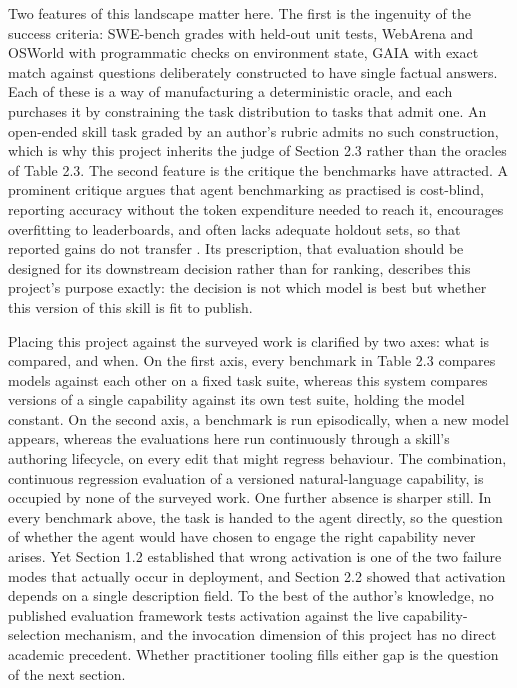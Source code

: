 Two features of this landscape matter here. The first is the ingenuity of the success criteria: SWE-bench grades with held-out unit tests, WebArena and OSWorld with programmatic checks on environment state, GAIA with exact match against questions deliberately constructed to have single factual answers. Each of these is a way of manufacturing a deterministic oracle, and each purchases it by constraining the task distribution to tasks that admit one. An open-ended skill task graded by an author's rubric admits no such construction, which is why this project inherits the judge of Section 2.3 rather than the oracles of Table 2.3. The second feature is the critique the benchmarks have attracted. A prominent critique argues that agent benchmarking as practised is cost-blind, reporting accuracy without the token expenditure needed to reach it, encourages overfitting to leaderboards, and often lacks adequate holdout sets, so that reported gains do not transfer \cite{kapoor2025agentsmatter}. Its prescription, that evaluation should be designed for its downstream decision rather than for ranking, describes this project's purpose exactly: the decision is not which model is best but whether this version of this skill is fit to publish.

Placing this project against the surveyed work is clarified by two axes: what is compared, and when. On the first axis, every benchmark in Table 2.3 compares models against each other on a fixed task suite, whereas this system compares versions of a single capability against its own test suite, holding the model constant. On the second axis, a benchmark is run episodically, when a new model appears, whereas the evaluations here run continuously through a skill's authoring lifecycle, on every edit that might regress behaviour. The combination, continuous regression evaluation of a versioned natural-language capability, is occupied by none of the surveyed work. One further absence is sharper still. In every benchmark above, the task is handed to the agent directly, so the question of whether the agent would have chosen to engage the right capability never arises. Yet Section 1.2 established that wrong activation is one of the two failure modes that actually occur in deployment, and Section 2.2 showed that activation depends on a single description field. To the best of the author's knowledge, no published evaluation framework tests activation against the live capability-selection mechanism, and the invocation dimension of this project has no direct academic precedent. Whether practitioner tooling fills either gap is the question of the next section.

